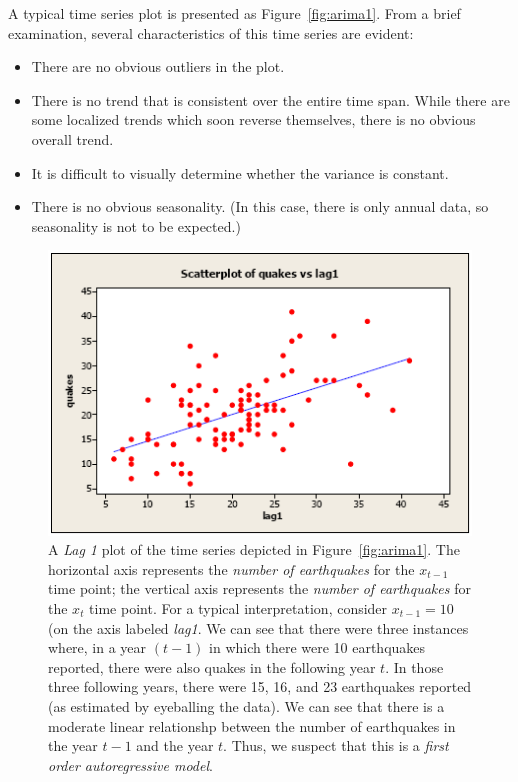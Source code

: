 \documentclass[12pt]{article}
\begin{document}
	


A typical time series plot is presented as Figure~\ref{fig:arima1}. From a brief examination, several characteristics of this time series are evident:
\begin{itemize}
\item There are no obvious outliers in the plot.
\item There is no trend that is consistent over the entire time span. While there are some localized trends which soon reverse themselves, there is no obvious overall trend.
\item It is difficult to visually determine whether the variance is constant.
\item There is no obvious seasonality. (In this case, there is only annual data, so seasonality is not to be expected.)
\end{itemize}

\begin{figure}
	\includegraphics[width=\textwidth, keepaspectratio]{TimeSeriesArima1-lagplot.png}
	\caption[caption]{A \textit{Lag 1} plot of the time series depicted in Figure~\ref{fig:arima1}. The horizontal axis represents the \textit{number of earthquakes} for the $x_{t-1}$ time point; the vertical axis represents the \textit{number of earthquakes} for the $x_t$ time point. 
\newline
\newline
\indent
For a typical interpretation, consider $x_{t-1}=10$ (on the axis labeled \textit{lag1}. We can see that there were three instances where, in a year $(t-1)$ in which there were 10 earthquakes reported, there were also quakes in the following year $t$. In those three following years, there were 15, 16, and 23 earthquakes reported (as estimated by eyeballing the data).
\newline
\newline
We can see that there is a moderate linear relationshp between the number of earthquakes in the year $t-1$ and the year $t$. Thus, we suspect that this is a \textit{first order autoregressive model}. }
	\label{fig:arima1lag}
\end{figure}
\end{document}
